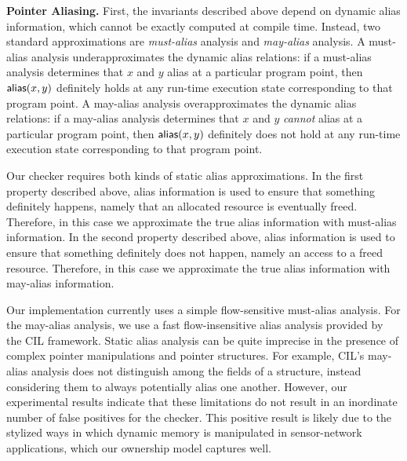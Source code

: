 \smallskip\noindent
{\bf Pointer Aliasing.}
First, the invariants described above depend on dynamic alias
information, which cannot be exactly computed at compile time.
Instead, two standard approximations are {\em must-alias} analysis and
{\em may-alias} analysis.  A must-alias analysis underapproximates the
dynamic alias relations:  if a must-alias analysis determines that $x$
and $y$ alias at a particular program point, then ${\mathsf{alias}}(x,y)$
definitely holds at any run-time execution state corresponding to that
program point.  A may-alias analysis overapproximates the dynamic
alias relations:  if a may-alias analysis determines that $x$ and $y$
{\em cannot} alias at a particular program point, then ${\mathsf{alias}}(x,y)$
definitely does not hold at any run-time execution state corresponding
to that program point.

Our checker requires both kinds of static alias approximations.  In
the first property described above, alias information is used to
ensure that something definitely happens, namely that an allocated
resource is eventually freed.  Therefore, in this case we approximate
the true alias information with must-alias information.  In the second
property described above, alias information is used to ensure that
something definitely does not happen, namely an access to a freed
resource.  Therefore, in this case we approximate the true alias
information with may-alias information.

Our implementation currently uses a simple flow-sensitive must-alias
analysis.  For the may-alias analysis, we use a fast flow-insensitive
alias analysis provided by the CIL framework.  Static alias analysis
can be quite imprecise in the presence of complex pointer
manipulations and pointer structures.  For example, CIL's may-alias
analysis does not distinguish among the fields of a structure, instead
considering them to always potentially alias one another.  However,
our experimental results indicate that these limitations do not result
in an inordinate number of false positives for the checker.  
%
%
This positive result is likely due to the stylized ways in which
dynamic memory is manipulated in sensor-network applications, which
our ownership model captures well.  

